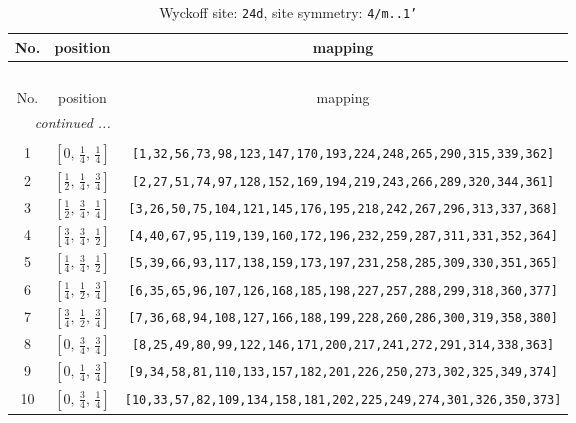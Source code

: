 \documentclass[fleqn,8pt]{jsarticle}
\begin{document}
\begin{longtable}{ccc}
\caption{Wyckoff site: {\tt 24d}, site symmetry: {\tt 4/m..1'}}
 \\
 \hline \hline
No. & position & mapping \\ \hline \endfirsthead

\multicolumn{2}{l}{\tablename\ \thetable{}} \\
 \hline \hline
No. & position & mapping \\ \hline \endhead

 \hline \hline
\multicolumn{2}{r}{\footnotesize\it continued ...} \\ \endfoot

 \hline \hline
\multicolumn{2}{r}{} \\ \endlastfoot

1 & $\left[ 0,\, \frac{1}{4},\, \frac{1}{4} \right]$ & {\tt [1,32,56,73,98,123,147,170,193,224,248,265,290,315,339,362]} \\ \hline
2 & $\left[ \frac{1}{2},\, \frac{1}{4},\, \frac{3}{4} \right]$ & {\tt [2,27,51,74,97,128,152,169,194,219,243,266,289,320,344,361]} \\ \hline
3 & $\left[ \frac{1}{2},\, \frac{3}{4},\, \frac{1}{4} \right]$ & {\tt [3,26,50,75,104,121,145,176,195,218,242,267,296,313,337,368]} \\ \hline
4 & $\left[ \frac{3}{4},\, \frac{3}{4},\, \frac{1}{2} \right]$ & {\tt [4,40,67,95,119,139,160,172,196,232,259,287,311,331,352,364]} \\ \hline
5 & $\left[ \frac{1}{4},\, \frac{3}{4},\, \frac{1}{2} \right]$ & {\tt [5,39,66,93,117,138,159,173,197,231,258,285,309,330,351,365]} \\ \hline
6 & $\left[ \frac{1}{4},\, \frac{1}{2},\, \frac{3}{4} \right]$ & {\tt [6,35,65,96,107,126,168,185,198,227,257,288,299,318,360,377]} \\ \hline
7 & $\left[ \frac{3}{4},\, \frac{1}{2},\, \frac{3}{4} \right]$ & {\tt [7,36,68,94,108,127,166,188,199,228,260,286,300,319,358,380]} \\ \hline
8 & $\left[ 0,\, \frac{3}{4},\, \frac{3}{4} \right]$ & {\tt [8,25,49,80,99,122,146,171,200,217,241,272,291,314,338,363]} \\ \hline
9 & $\left[ 0,\, \frac{1}{4},\, \frac{3}{4} \right]$ & {\tt [9,34,58,81,110,133,157,182,201,226,250,273,302,325,349,374]} \\ \hline
10 & $\left[ 0,\, \frac{3}{4},\, \frac{1}{4} \right]$ & {\tt [10,33,57,82,109,134,158,181,202,225,249,274,301,326,350,373]} \\ \hline

\end{longtable}
\end{document}
